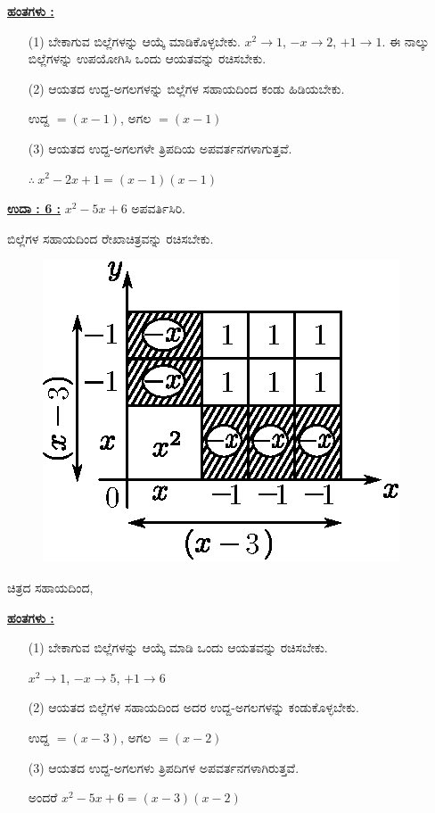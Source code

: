 \noindent
{\textbf{\underline{ಹಂತಗಳು :}}}
\begin{itemize}
\item [(1)] ಬೇಕಾಗುವ ಬಿಲ್ಲೆಗಳನ್ನು ಆಯ್ಕೆ ಮಾಡಿಕೊಳ್ಳಬೇಕು. $x^2 \rightarrow 1$, $-x \rightarrow 2$, $+1 \rightarrow 1$. ಈ ನಾಲ್ಕು ಬಿಲ್ಲೆಗಳನ್ನು ಉಪಯೋಗಿಸಿ ಒಂದು ಆಯತವನ್ನು ರಚಿಸಬೇಕು. 
\item [(2)] ಆಯತದ ಉದ್ದ-ಅಗಲಗಳನ್ನು ಬಿಲ್ಲೆಗಳ ಸಹಾಯದಿಂದ ಕಂಡು ಹಿಡಿಯಬೇಕು. 

ಉದ್ದ $= (x-1)$, ಅಗಲ $= (x-1)$

\item [(3)] ಆಯತದ ಉದ್ದ-ಅಗಲಗಳೇ ತ್ರಿಪದಿಯ ಅಪವರ್ತನಗಳಾಗುತ್ತವೆ. 

$\therefore~ x^2 - 2x + 1 = (x-1)(x-1)$
\end{itemize}

\noindent
{\textbf{\underline{ಉದಾ : 6 :}}} $x^2 - 5x + 6$ ಅಪವರ್ತಿಸಿರಿ. 

ಬಿಲ್ಲೆಗಳ ಸಹಾಯದಿಂದ ರೇಖಾಚಿತ್ರವನ್ನು ರಚಿಸಬೇಕು.
\begin{figure}[H]
\centering
\includegraphics[scale=0.8]{src/figure/chap3/fig3-44.eps}
\end{figure}
ಚಿತ್ರದ ಸಹಾಯದಿಂದ,

\eject

\noindent
{\textbf{\underline{ಹಂತಗಳು :}}}
\begin{itemize}
\item [(1)] ಬೇಕಾಗುವ ಬಿಲ್ಲೆಗಳನ್ನು ಆಯ್ಕೆ ಮಾಡಿ ಒಂದು ಆಯತವನ್ನು ರಚಿಸಬೇಕು. 

$x^2 \rightarrow 1$, $-x \rightarrow 5$, $+1 \rightarrow 6$
\item [(2)] ಆಯತದ ಬಿಲ್ಲೆಗಳ ಸಹಾಯದಿಂದ ಅದರ ಉದ್ದ-ಅಗಲಗಳನ್ನು ಕಂಡುಕೊಳ್ಳಬೇಕು. 

ಉದ್ದ $= (x-3)$, ಅಗಲ $= (x-2)$

\item [(3)] ಆಯತದ ಉದ್ದ-ಅಗಲಗಳು ತ್ರಿಪದಿಗಳ ಅಪವರ್ತನಗಳಾಗಿರುತ್ತವೆ. 

ಅಂದರೆ $x^2 - 5x + 6 = (x - 3)(x - 2)$
\end{itemize}

